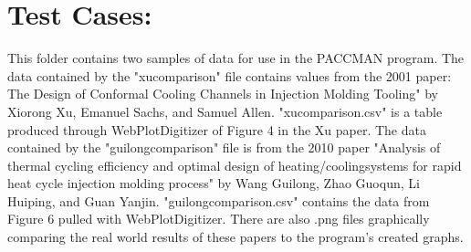 \documentclass[a4paper,12pt]{article}
\begin{document}
\section*{Test Cases:}

This folder contains two samples of data for use in the PACCMAN program.  The data contained by the "xucomparison" file contains values from the 2001 paper: The Design of Conformal Cooling Channels in Injection Molding Tooling" by Xiorong Xu, Emanuel Sachs, and Samuel Allen. "xucomparison.csv" is a table produced through WebPlotDigitizer of Figure 4 in the Xu paper. The data contained by the "guilongcomparison" file is from the 2010 paper "Analysis of thermal cycling efficiency and optimal design of heating/coolingsystems for rapid heat cycle injection molding process" by Wang Guilong, Zhao Guoqun, Li Huiping, and Guan Yanjin. "guilongcomparison.csv" contains the data from Figure 6 pulled with WebPlotDigitizer. There are also .png files graphically comparing the real world results of these papers to the program's created graphs.
\end{document}
